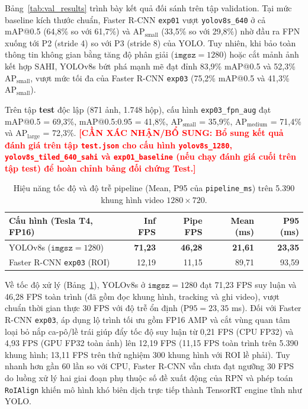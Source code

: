 \documentclass[11pt]{article}
\newcommand{\needconfirm}[1]{\textcolor{red}{\textbf{[CẦN XÁC NHẬN/BỔ SUNG: #1]}}}
\begin{document}
Bảng~\ref{tab:val_results} trình bày kết quả đối sánh trên tập validation. Tại mức baseline kích thước chuẩn, Faster R-CNN \texttt{exp01} vượt \texttt{yolov8s\_640} ở cả mAP@0.5 (64,8\% so với 61,7\%) và $\text{AP}_{\text{small}}$ (33,5\% so với 29,8\%) nhờ đầu ra FPN xuống tới P2 (stride 4) so với P3 (stride 8) của YOLO. Tuy nhiên, khi bảo toàn thông tin không gian bằng tăng độ phân giải ($\texttt{imgsz}=1280$) hoặc cắt mảnh ảnh kết hợp SAHI, YOLOv8s bứt phá mạnh mẽ đạt đỉnh 83,9\% mAP@0.5 và 52,3\% $\text{AP}_{\text{small}}$, vượt mức tối đa của Faster R-CNN \texttt{exp03} (75,2\% mAP@0.5 và 41,3\% $\text{AP}_{\text{small}}$).

Trên tập \textbf{test} độc lập (871 ảnh, 1.748 hộp), cấu hình \texttt{exp03\_fpn\_aug} đạt mAP@0.5 = 69,3\%, mAP@0.5:0.95 = 41,8\%, $\text{AP}_{\text{small}}$ = 35,9\%, $\text{AP}_{\text{medium}}$ = 71,4\% và $\text{AP}_{\text{large}}$ = 72,3\%. \needconfirm{Bổ sung kết quả đánh giá trên tập \texttt{test.json} cho cấu hình \texttt{yolov8s\_1280}, \texttt{yolov8s\_tiled\_640\_sahi} và \texttt{exp01\_baseline} (nếu chạy đánh giá cuối trên tập test) để hoàn chỉnh bảng đối chứng Test.}

\begin{table}[t]
\centering
\small
\begin{tabular}{lrrrr}
\toprule
\textbf{Cấu hình (Tesla T4, FP16)} & \textbf{Inf FPS} & \textbf{Pipe FPS} & \textbf{Mean (ms)} & \textbf{P95 (ms)} \\
\midrule
YOLOv8s ($\texttt{imgsz}=1280$) & \textbf{71,23} & \textbf{46,28} & \textbf{21,61} & \textbf{23,35} \\
Faster R-CNN \texttt{exp03} (ROI) & 12,19 & 11,15 & 89,71 & 93,59 \\
\bottomrule
\end{tabular}
\caption{Hiệu năng tốc độ và độ trễ pipeline (Mean, P95 của \texttt{pipeline\_ms}) trên 5.390 khung hình video $1280\times 720$.}
\label{tab:fps}
\end{table}

Về tốc độ xử lý (Bảng~\ref{tab:fps}), YOLOv8s ở $\texttt{imgsz}=1280$ đạt 71,23 FPS suy luận và 46,28 FPS toàn trình (đã gồm đọc khung hình, tracking và ghi video), vượt chuẩn thời gian thực 30 FPS với độ trễ ổn định ($\text{P95}=23{,}35$ ms). Đối với Faster R-CNN \texttt{exp03}, áp dụng lộ trình tối ưu gồm FP16 AMP và cắt vùng quan tâm loại bỏ nắp ca-pô/lề trái giúp đẩy tốc độ suy luận từ 0,21 FPS (CPU FP32) và 4,93 FPS (GPU FP32 toàn ảnh) lên 12,19 FPS (11,15 FPS toàn trình trên 5.390 khung hình; 13,11 FPS trên thử nghiệm 300 khung hình với ROI lề phải). Tuy nhanh hơn gần 60 lần so với CPU, Faster R-CNN vẫn chưa đạt ngưỡng 30 FPS do luồng xử lý hai giai đoạn phụ thuộc số đề xuất động của RPN và phép toán \texttt{RoIAlign} khiến mô hình khó biên dịch trực tiếp thành TensorRT engine tĩnh như YOLO.
\end{document}
